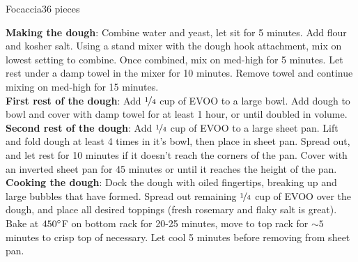 \begin{recipe}{Focaccia}{36 pieces}{}



    \textbf{Making the dough}: Combine water and yeast, let sit for 5 minutes. Add flour and kosher salt. Using a stand mixer with the dough hook attachment, mix on lowest setting to combine. Once combined, mix on med-high for 5 minutes. Let rest under a damp towel in the mixer for 10 minutes. Remove towel and continue mixing on med-high for 15 minutes. \\

    \textbf{First rest of the dough}: Add $\nicefrac{1}{4}$ cup of EVOO to a large bowl. Add dough to bowl and cover with damp towel for at least 1 hour, or until doubled in volume. \\

    \textbf{Second rest of the dough}: Add $\nicefrac{1}{4}$ cup of EVOO to a large sheet pan. Lift and fold dough at least 4 times in it's bowl, then place in sheet pan. Spread out, and let rest for 10 minutes if it doesn't reach the corners of the pan. Cover with an inverted sheet pan for 45 minutes or until it reaches the height of the pan. \\

    \textbf{Cooking the dough}: Dock the dough with oiled fingertips, breaking up and large bubbles that have formed. Spread out remaining $\nicefrac{1}{4}$ cup of EVOO over the dough, and place all desired toppings (fresh rosemary and flaky salt is great). Bake at $450\degree$F on bottom rack for 20-25 minutes, move to top rack for $\sim5$ minutes to crisp top of necessary. Let cool 5 minutes before removing from sheet pan.
\end{recipe}